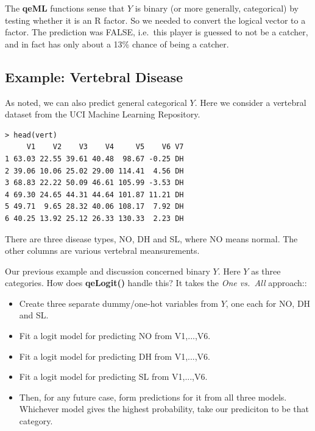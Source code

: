 The \textbf{qeML} functions sense that $Y$ is binary (or more generally,
categorical) by testing whether it is an R factor.  So we needed to
convert the logical vector to a factor.  The prediction was FALSE, i.e.\
this player is guessed to not be a catcher, and in fact has only about a
13\% chance of being a catcher.

\subsection{Example:  Vertebral Disease}

As noted, we can also predict general categorical $Y$.  Here we
consider a vertebral dataset from the UCI Machine Learning Repository.

\begin{lstlisting}
> head(vert)
     V1    V2    V3    V4     V5    V6 V7
1 63.03 22.55 39.61 40.48  98.67 -0.25 DH
2 39.06 10.06 25.02 29.00 114.41  4.56 DH
3 68.83 22.22 50.09 46.61 105.99 -3.53 DH
4 69.30 24.65 44.31 44.64 101.87 11.21 DH
5 49.71  9.65 28.32 40.06 108.17  7.92 DH
6 40.25 13.92 25.12 26.33 130.33  2.23 DH
\end{lstlisting}

There are three disease types, NO, DH and SL, where NO means normal.
The other columns are various vertebral meansurements.

Our previous example and discussion concerned binary $Y$.  Here $Y$
as three categories.  How does \textbf{qeLogit()} handle this?  It takes
the \textit{One vs.\ All} approach::

\begin{itemize}

\item Create three separate dummy/one-hot variables from $Y$, one each
for NO, DH and SL. 

\item Fit a logit model for predicting NO from V1,...,V6.

\item Fit a logit model for predicting DH from V1,...,V6.

\item Fit a logit model for predicting SL from V1,...,V6.

\item Then, for any future case, form predictions for it from all three
models.  Whichever model gives the highest probability, take our
prediciton to be that category.

\end{itemize} 

